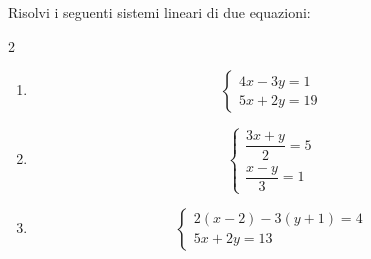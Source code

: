 \begin{question}[ID=1.4, subtitle={Sistemi lineari con parametro numerico e coefficienti frazionari}, difficulty=difficile, tags={sistemi, equazioni lineari}]
Risolvi i seguenti sistemi lineari di due equazioni:
\begin{multicols}{2}
\begin{enumerate}[leftmargin=3.2cm]
    \item
    \[
    \begin{cases}
    4x-3y=1\\
    5x+2y=19
    \end{cases}
    \]

    \item
    \[
    \begin{cases}
    \dfrac{3x+y}{2}=5\\
    \dfrac{x-y}{3}=1
    \end{cases}
    \]

    \item
    \[
    \begin{cases}
    2(x-2)-3(y+1)=4\\
    5x+2y=13
    \end{cases}
    \]


\end{enumerate}
\end{multicols}
\end{question}

